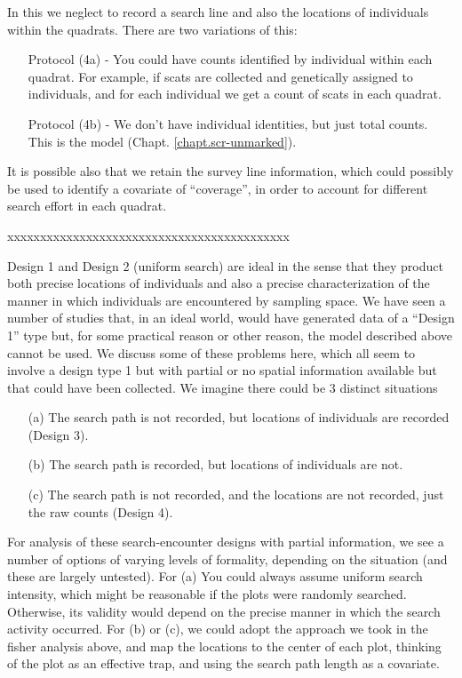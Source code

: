 In this we neglect to record a search line and also the locations of individuals
within the quadrats.  There are two variations of this:
\begin{itemize}
\item[] Protocol (4a) - You could have
counts
identified by individual within each quadrat.
For example, if scats are collected and genetically assigned to individuals, and for each individual we get a count of scats in each quadrat.
\item[] Protocol (4b) - We don't have
individual identities, but just total counts. This is the
\citet{chandler_royle:2012} model (Chapt. \ref{chapt.scr-unmarked}).
\end{itemize}
It is possible also that we retain the survey line information, which
could possibly be used to identify a covariate of ``coverage'', in
order to account for different search effort in each quadrat.


xxxxxxxxxxxxxxxxxxxxxxxxxxxxxxxxxxxxxxxxxxx

Design 1 and Design 2 (uniform search) are ideal in the sense that they product
both precise locations of individuals and also a precise
characterization of the manner in which individuals are encountered
by sampling space.
We have seen a number of studies that, in an ideal world, would have
generated data of a ``Design 1'' type but, for some practical reason
or other reason, the model described above cannot be used.
We discuss some of these problems here, which all seem to involve a
design type 1 but with partial or no spatial information available but
that could
have been collected. We imagine there could be
3 distinct situations
\begin{itemize}
\item[(a)] The search path is not recorded, but locations  of
  individuals are recorded (Design 3).
\item[(b)] The search path is recorded, but locations of individuals
  are not.
\item[(c)] The search path is not recorded, and the locations are not
  recorded, just the raw counts (Design 4).
\end{itemize}

For analysis of these search-encounter designs with partial information,
we see a number of options of varying levels of formality,
depending on the situation (and these are largely untested). 
For (a) You could always assume uniform search intensity,
which might be reasonable if the plots were randomly
searched. Otherwise, its validity would depend on the precise manner
in which the search activity occurred. 
For (b) or (c), we could adopt the approach we took in the fisher analysis
above, and  map the locations to the center of each plot, thinking of
the plot as an effective trap, and using the search path length
as a covariate.



